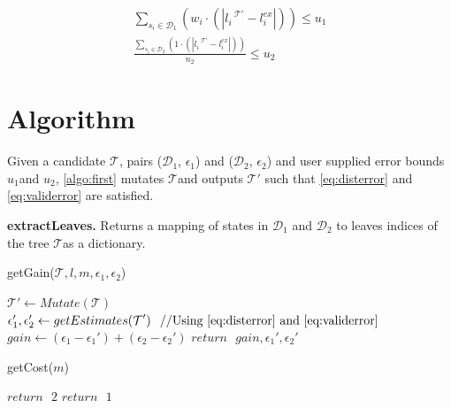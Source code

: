 \documentclass{llncs}
\newcommand{\candidate}{$\mathcal{T}$}
\newcommand{\distdata}{$\mathcal{D}_1$}
\newcommand{\validata}{$\mathcal{D}_2$}
\newcommand{\userrdist}{$u_1$}
\newcommand{\userrvalid}{$u_2$}
\begin{document}
\begin{align}
	& \sum_{s_i \in \mathcal{D}_1}(w_i \cdot (|l_i^{\text{ \candidate}'} - l_i^{ex}|)) \leq \text{\userrdist}  \label{eq:disterror}& \\
	& \frac{\sum_{s_i \in \mathcal{D}_2}(1 \cdot (|l_i^{\text{ \candidate}'} - l_i^{ex}|))}{n_2} \leq \text{\userrvalid} \label{eq:validerror} &
\end{align}


\section{Algorithm}

Given a candidate $\text{\candidate}$, pairs (\distdata, $\epsilon_1$) and (\validata, $\epsilon_2$) and user supplied error bounds \userrdist and \userrvalid, \cref{algo:first} mutates \candidate and outputs $\text{\candidate}'$ such that \cref{eq:disterror} and \cref{eq:validerror} are satisfied.

\textbf{extractLeaves.} Returns a mapping of states in $\text{\distdata}$ and $\text{\validata}$ to leaves indices of the tree \candidate as a dictionary.



\begin{algorithm}
	\caption{getGain($\text{\candidate}, l, m, \epsilon_1, \epsilon_2$)}
	\label{algo:gain}
	\begin{algorithmic}[1]
		\State $\text{\candidate}' \gets Mutate(\text{\candidate})$
		\State $\epsilon_1', \epsilon_2' \gets getEstimates(\text{\candidate}') \text{\hspace{0.1 in}//Using \cref{eq:disterror} and \cref{eq:validerror}}$
		\State $gain \gets (\epsilon_1 - \epsilon_1') + (\epsilon_2 - \epsilon_2')$
		\State $return \text{ } gain, \epsilon_1', \epsilon_2'$		
	\end{algorithmic}
\end{algorithm}


\begin{algorithm}
	\caption{getCost($m$)}
	\label{algo:cost}
	\begin{algorithmic}[1]
		\State $return\text{ }2$
		\Else
		\State $return\text{ }1$
		\EndIf
	\end{algorithmic}
\end{algorithm}
\end{document}
